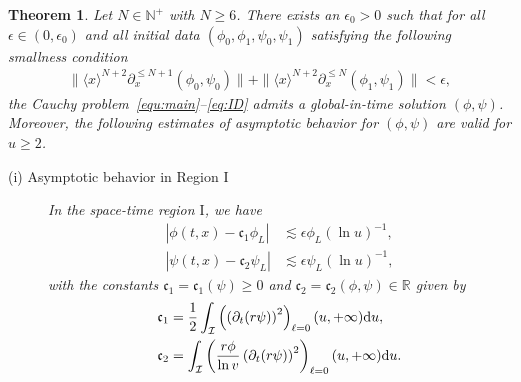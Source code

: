 \documentclass[a4paper,reqno]{amsart}
\newtheorem{theorem}{Theorem}[section]
\theoremstyle{definition}
\numberwithin{equation}{section}
\def \R {{\mathbb{R} }}
\def \d {{\rm{d}}}
\def \pt{\partial_{t}}
\def\ep{\epsilon}
\begin{document}
 \begin{theorem}\label{thm:main1}
 Let $N\in \mathbb{N}^{+}$ with $N\ge 6$. There exists {an} $\epsilon_{0}>0$ such that for all $\epsilon\in (0,\epsilon_{0})$ and all  initial data $(\phi_{0},\phi_1, \psi_{0}, \psi_1)$ satisfying the {following} smallness condition
\begin{equation}\label{est:smallness1}
\begin{aligned}
    \|\langle x\rangle^{{N}+2} \partial_x^{\leq N+1} (\phi_0,  \psi_0)\| 
    +  \|\langle x\rangle^{{N}+2} \partial_x^{\leq N} (\phi_1, \psi_1)\|   
    <\epsilon,
    \end{aligned}
\end{equation}
 the Cauchy problem~\eqref{equ:main}--\eqref{eq:ID} 
 admits a global-in-time solution $(\phi,\psi)$. Moreover, the following estimates of asymptotic behavior for $(\phi,\psi)$  are valid for $u\ge 2$.

 \begin{description}

         \item [ (i) Asymptotic behavior in \textrm{Region} $\mathrm{I}$]
         In the space-time region $\mathrm{I}$, we have 
          \begin{equation}
     \begin{aligned}
         \left|\phi(t,x)-\mathfrak{c}_{1}\phi_{L}\right|&\lesssim
        \ep \phi_{L}(\ln u)^{-1},\\
         \left|\psi(t,x)-\mathfrak{c}_{2}\psi_{L}\right|&\lesssim \ep \psi_{L}(\ln u)^{-1},
         \end{aligned}
         \end{equation}
{with} the constants {$\mathfrak{c}_{1}=\mathfrak{c}_{1}(\psi)\geq 0$ and $\mathfrak{c}_{2}=\mathfrak{c}_{2}(\phi,\psi)\in \R$}  given by 
         \begin{equation}
         \label{def:cfrak1and2:intro}
             \begin{aligned}
\mathfrak{c}_{1}&=\frac{1}{2}\int_{\mathcal{I}}
                 \left(\left(\pt (r\psi)\right)^{2}\right)_{\ell=0}(u,+\infty)\d u,\\
\mathfrak{c}_{2}&=\int_{\mathcal{I}}
                 \left(\frac{r\phi}{\ln v}
                 \left(\pt (r\psi)\right)^{2}\right)_{\ell=0}(u,+\infty)\d u.
             \end{aligned}
         \end{equation}


\end{description}
\end{theorem}
\end{document}
